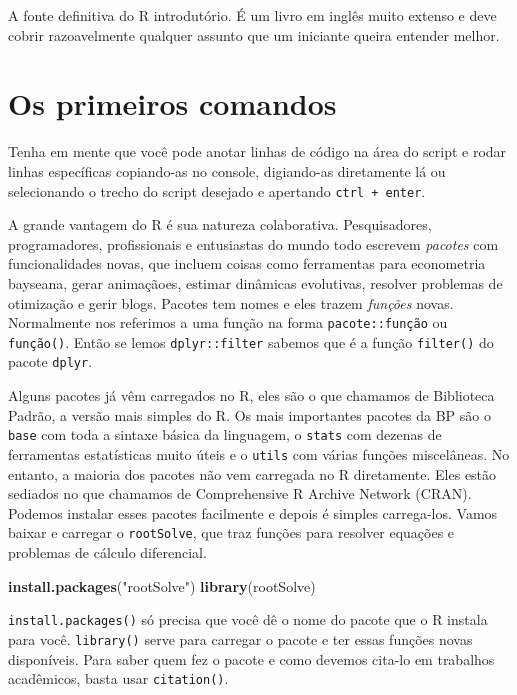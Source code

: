 \documentclass[
]{article}
\newenvironment{Shaded}{\begin{snugshade}}{\end{snugshade}}
\newcommand{\KeywordTok}[1]{\textcolor[rgb]{0.13,0.29,0.53}{\textbf{#1}}}
\newcommand{\NormalTok}[1]{#1}
\newcommand{\StringTok}[1]{\textcolor[rgb]{0.31,0.60,0.02}{#1}}
\begin{document}
A fonte definitiva do R introdutório. É um livro em inglês muito extenso
e deve cobrir razoavelmente qualquer assunto que um iniciante queira
entender melhor.

\hypertarget{os-primeiros-comandos}{%
\section{Os primeiros comandos}\label{os-primeiros-comandos}}

Tenha em mente que você pode anotar linhas de código na área do script e
rodar linhas específicas copiando-as no console, digiando-as diretamente
lá ou selecionando o trecho do script desejado e apertando
\texttt{ctrl\ +\ enter}.

A grande vantagem do R é sua natureza colaborativa. Pesquisadores,
programadores, profissionais e entusiastas do mundo todo escrevem
\emph{pacotes} com funcionalidades novas, que incluem coisas como
ferramentas para econometria bayseana, gerar animaçãoes, estimar
dinâmicas evolutivas, resolver problemas de otimização e gerir blogs.
Pacotes tem nomes e eles trazem \emph{funções} novas. Normalmente nos
referimos a uma função na forma \texttt{pacote::função} ou
\texttt{função()}. Então se lemos \texttt{dplyr::filter} sabemos que é a
função \texttt{filter()} do pacote \texttt{dplyr}.

Alguns pacotes já vêm carregados no R, eles são o que chamamos de
Biblioteca Padrão, a versão mais simples do R. Os mais importantes
pacotes da BP são o \texttt{base} com toda a sintaxe básica da
linguagem, o \texttt{stats} com dezenas de ferramentas estatísticas
muito úteis e o \texttt{utils} com várias funções miscelâneas. No
entanto, a maioria dos pacotes não vem carregada no R diretamente. Eles
estão sediados no que chamamos de Comprehensive R Archive Network
(CRAN). Podemos instalar esses pacotes facilmente e depois é simples
carrega-los. Vamos baixar e carregar o \texttt{rootSolve}, que traz
funções para resolver equações e problemas de cálculo diferencial.

\begin{Shaded}
\begin{Highlighting}[]
\KeywordTok{install.packages}\NormalTok{(}\StringTok{"rootSolve"}\NormalTok{)}
\KeywordTok{library}\NormalTok{(rootSolve)}
\end{Highlighting}
\end{Shaded}

\texttt{install.packages()} só precisa que você dê o nome do pacote que
o R instala para você. \texttt{library()} serve para carregar o pacote e
ter essas funções novas disponíveis. Para saber quem fez o pacote e como
devemos cita-lo em trabalhos acadêmicos, basta usar \texttt{citation()}.
\end{document}
